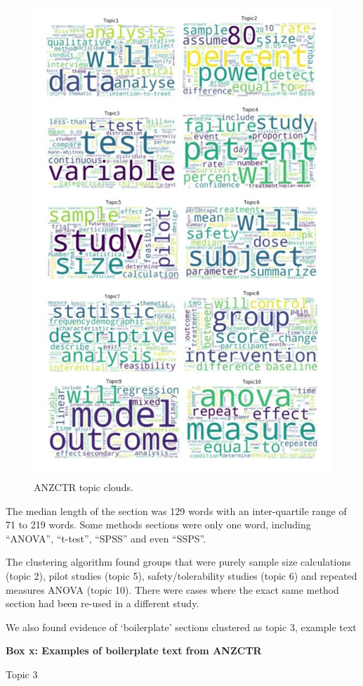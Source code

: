 \documentclass[12pt]{article}
\begin{document}
\begin{figure}

{\centering \includegraphics[width=0.7\linewidth]{figures/anzctr.wordclouds} 

}

\caption{ANZCTR topic clouds.}\label{fig:unnamed-chunk-9}
\end{figure}

The median length of the section was 129 words with an inter-quartile
range of 71 to 219 words. Some methods sections were only one word,
including ``ANOVA'', ``t-test'', ``SPSS'' and even ``SSPS''.

The clustering algorithm found groups that were purely sample size
calculations (topic 2), pilot studies (topic 5), safety/tolerability
studies (topic 6) and repeated measures ANOVA (topic 10). There were
cases where the exact same method section had been re-used in a
different study.

We also found evidence of `boilerplate' sections clustered as topic 3,
example text

\textbf{Box x: Examples of boilerplate text from ANZCTR}

Topic 3
\end{document}
